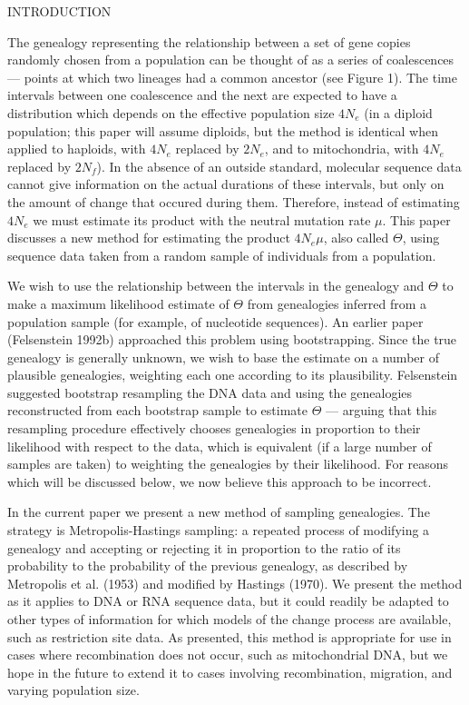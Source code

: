 \documentclass[12pt]{article}
\begin{document}
\bigskip
\begin{center}
INTRODUCTION
\end{center}

\bigskip
The genealogy representing the relationship between a set of
gene copies randomly chosen from a population can be thought of as a
series of coalescences --- points at which two lineages had a common
ancestor (see Figure 1).  The time intervals between one coalescence and the next are
expected to have a distribution which depends on the
effective population size $4N_{e}$ (in a diploid population;
this paper will assume diploids, but the method is identical when
applied to haploids, with $4N_e$ replaced by $2N_e$, and to
mitochondria, with $4N_e$ replaced by $2N_f$). 
In the absence of an outside
standard, molecular sequence data cannot give information on the actual
durations of these intervals, but only on the amount of change that occured
during them.  Therefore, instead of estimating $4N_{e}$ we must estimate its
product with the neutral mutation rate $\mu$.
This paper discusses a new method for estimating the
product $4N_{e}\mu$, also called $\Theta$, using sequence data taken from a
random sample of individuals from a population.

We wish to use the relationship between the intervals in the
genealogy and $\Theta$ to make a maximum likelihood estimate
of $\Theta$ from genealogies inferred from a population 
sample (for example, of nucleotide sequences).
An earlier paper ({\sc Felsenstein} 1992b) approached this problem using
bootstrapping.  Since the true genealogy is generally unknown, we wish to
base the estimate on
a number of plausible genealogies, weighting each one according to
its plausibility.  {\sc Felsenstein} suggested bootstrap resampling the DNA 
data and using the genealogies reconstructed from each bootstrap sample to
estimate $\Theta$ --- arguing that this
resampling procedure effectively chooses genealogies in proportion to
their likelihood with respect to the data, which is equivalent (if a large 
number of samples are
taken) to weighting the genealogies by their
likelihood.  For reasons which will be discussed below, we now believe
this approach to be incorrect.

In the current paper we present a new method of sampling genealogies.
The strategy is Metropolis-Hastings sampling:
a repeated process of modifying a genealogy and accepting or rejecting
it in proportion to the ratio of its probability
to the probability of the previous genealogy, as described by {\sc Metropolis}
et al. (1953) and modified by {\sc Hastings} (1970). 
We present the method as it applies to DNA or RNA sequence data, but it
could readily be adapted to other types of information for which models
of the change process are available, such as restriction site data.
As presented, this method is appropriate for use in cases where
recombination does not occur, such as mitochondrial DNA, but we hope in the future
to extend it to cases involving recombination, migration, and varying
population size.
\end{document}

